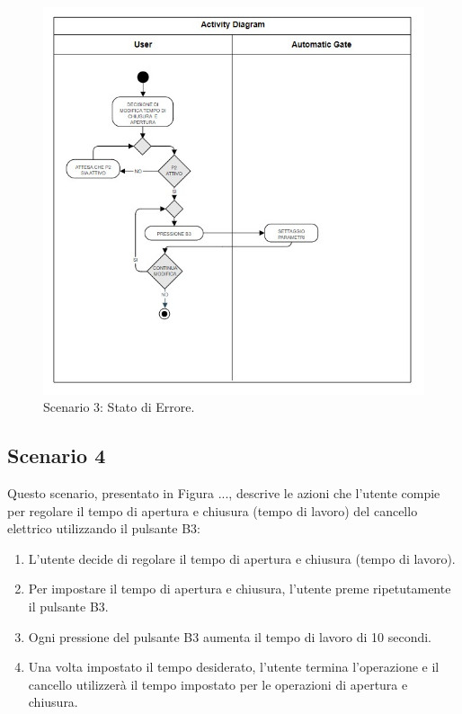 \documentclass[12pt]{article}
\begin{document}
\begin{figure}[h]
    \centering
    \includegraphics[width = 0.7 \textwidth]{Scenario_3.jpg}
    \caption{Scenario 3: Stato di Errore.}
    
\end{figure}

\newpage
\subsection{Scenario 4}
Questo scenario, presentato in Figura ..., descrive le azioni che l’utente compie per regolare il tempo di apertura e chiusura (tempo di lavoro) del cancello elettrico utilizzando il pulsante B3:

\begin{enumerate}
    \item L’utente decide di regolare il tempo di apertura e chiusura (tempo di lavoro).
    \item Per impostare il tempo di apertura e chiusura, l’utente preme ripetutamente il pulsante B3.
    \item Ogni pressione del pulsante B3 aumenta il tempo di lavoro di 10 secondi.
    \item Una volta impostato il tempo desiderato, l’utente termina l’operazione e il cancello utilizzerà il tempo impostato per le operazioni di apertura e chiusura.
\end{enumerate}
\end{document}
